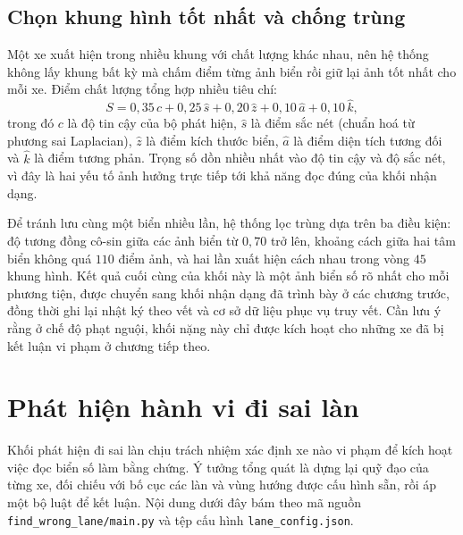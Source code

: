 \documentclass[12pt,a4paper]{report}
\begin{document}
\section{Chọn khung hình tốt nhất và chống trùng}
Một xe xuất hiện trong nhiều khung với chất lượng khác nhau, nên hệ thống không lấy khung bất kỳ mà chấm điểm từng ảnh biển rồi giữ lại ảnh tốt nhất cho mỗi xe. Điểm chất lượng tổng hợp nhiều tiêu chí:
\begin{equation}
S = 0{,}35\,c + 0{,}25\,\hat{s} + 0{,}20\,\hat{z} + 0{,}10\,\hat{a} + 0{,}10\,\hat{k},
\end{equation}
trong đó $c$ là độ tin cậy của bộ phát hiện, $\hat{s}$ là điểm sắc nét (chuẩn hoá từ phương sai Laplacian), $\hat{z}$ là điểm kích thước biển, $\hat{a}$ là điểm diện tích tương đối và $\hat{k}$ là điểm tương phản. Trọng số dồn nhiều nhất vào độ tin cậy và độ sắc nét, vì đây là hai yếu tố ảnh hưởng trực tiếp tới khả năng đọc đúng của khối nhận dạng.

Để tránh lưu cùng một biển nhiều lần, hệ thống lọc trùng dựa trên ba điều kiện: độ tương đồng cô-sin giữa các ảnh biển từ $0{,}70$ trở lên, khoảng cách giữa hai tâm biển không quá $110$ điểm ảnh, và hai lần xuất hiện cách nhau trong vòng $45$ khung hình. Kết quả cuối cùng của khối này là một ảnh biển số rõ nhất cho mỗi phương tiện, được chuyển sang khối nhận dạng đã trình bày ở các chương trước, đồng thời ghi lại nhật ký theo vết và cơ sở dữ liệu phục vụ truy vết. Cần lưu ý rằng ở chế độ phạt nguội, khối nặng này chỉ được kích hoạt cho những xe đã bị kết luận vi phạm ở chương tiếp theo.

\chapter{Phát hiện hành vi đi sai làn}

Khối phát hiện đi sai làn chịu trách nhiệm xác định xe nào vi phạm để kích hoạt việc đọc biển số làm bằng chứng. Ý tưởng tổng quát là dựng lại quỹ đạo của từng xe, đối chiếu với bố cục các làn và vùng hướng được cấu hình sẵn, rồi áp một bộ luật để kết luận. Nội dung dưới đây bám theo mã nguồn \texttt{find\_wrong\_lane/main.py} và tệp cấu hình \texttt{lane\_config.json}.
\end{document}
